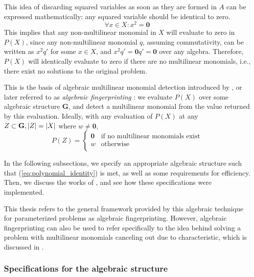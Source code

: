 This idea of discarding squared variables as soon as they are formed in $A$ 
can be expressed mathematically: any squared variable should be identical to
zero. 
\begin{equation}
  \label{eq:squared_to_zero}
\forall x \in X: x^2 = \mathbf{0}
\end{equation}
This implies that any non-multilinear monomial in $X$ will evaluate to zero in $P(X)$, since 
any non-multilinear monomial $q$, assuming commutativity, can be written as $x^2q'$ 
for some $x \in X$, and $x^2q' = \mathbf{0}q' = \mathbf{0}$ over any algebra. 
Therefore, $P(X)$ will identically evaluate to zero if there are no multilinear monomials, 
i.e., there exist no solutions to the original problem.

This is the basis of algebraic multilinear monomial detection introduced by 
\textcite{Koutis08}, 
or later referred to as \emph{algebraic fingerprinting} \cite{KouWil15}: 
we evaluate $P(X)$ over some algebraic structure $\mathbf{G}$, 
and detect a multilinear monomial from 
the value returned by this evaluation. Ideally, with any 
evaluation of $P(X)$ at any $Z \subset \mathbf{G}, {\left\vert Z\right\vert} = {\left\vert X\right\vert}$ 
where $w \neq \mathbf{0}$, 
\begin{equation}
  \label{eq:polynomial_identity}
  P(Z) =
    \begin{cases}
      \mathbf{0} & \text{if no multilinear monomials exist}\\
      w & \text{otherwise}\\
    \end{cases}       
\end{equation}

In the following subsections, we specify an appropriate algebraic structure such that 
(\ref{eq:polynomial_identity}) is met, as well as some requirements for efficiency. 
Then, we discuss the works of \textcite{Koutis08}, 
and see how these specifications were implemented.

This thesis refers to the general framework provided 
by this algebraic technique for parameterized problems \cite{KouWil09, KouWil15} as 
algebraic fingerprinting. However, algebraic fingerprinting can also 
be used to refer specifically to the idea behind solving a problem 
with multilinear monomials canceling out due to characteristic,  
which is discussed in .

\subsubsection{Specifications for the algebraic structure}
\label{sect:algebra_specs}

